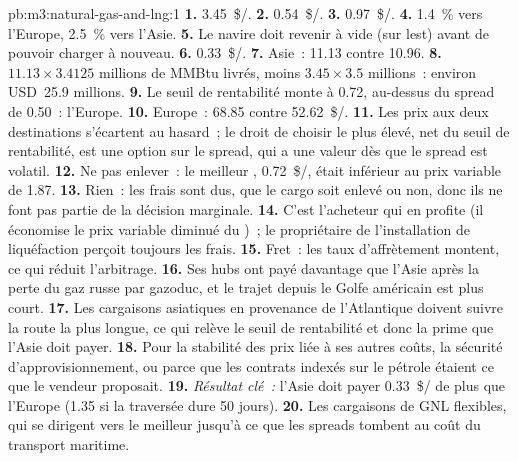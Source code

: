 \begin{solution}{pb:m3:natural-gas-and-lng:1}
\textbf{1.} \qty{3.45}{\$/\mmbtu}. \textbf{2.} \qty{0.54}{\$/\mmbtu}. \textbf{3.}
\qty{0.97}{\$/\mmbtu}. \textbf{4.} 1.4~\% vers l'Europe, 2.5~\% vers l'Asie. \textbf{5.} Le navire
doit revenir à vide (sur lest) avant de pouvoir charger à nouveau.
\textbf{6.} \qty{0.33}{\$/\mmbtu}. \textbf{7.} Asie~:  \qty{11.13}{} contre
\qty{10.96}{}. \textbf{8.} $11.13 \times 3.4125$ millions de MMBtu livrés, moins $3.45 \times
3.5$ millions~: environ USD~25.9 millions. \textbf{9.} Le seuil de rentabilité monte à \qty{0.72}{}, au-dessus
du spread de \qty{0.50}{}~: l'Europe. \textbf{10.} Europe~:  \qty{68.85}{} contre
\qty{52.62}{\$/\mmbtu}.
\textbf{11.} Les prix aux deux destinations s'écartent au hasard~; le droit de choisir le
plus élevé, net du seuil de rentabilité, est une option sur le spread, qui a une valeur dès que le
spread est volatil. \textbf{12.} Ne pas enlever~: le meilleur , \qty{0.72}{\$/\mmbtu}, était
inférieur au prix variable de \qty{1.87}{}. \textbf{13.} Rien~: les frais sont dus,
que le cargo soit enlevé ou non, donc ils ne font pas partie de la décision marginale. \textbf{14.} C'est
l'acheteur qui en profite (il économise le prix variable diminué du )~; le propriétaire de l'installation
de liquéfaction perçoit toujours les frais. \textbf{15.} Fret~: les taux d'affrètement montent, ce qui réduit l'arbitrage.
\textbf{16.} Ses hubs ont payé davantage que l'Asie après la perte du gaz russe par gazoduc, et le
trajet depuis le Golfe américain est plus court. \textbf{17.} Les cargaisons asiatiques en provenance de l'Atlantique doivent suivre
la route la plus longue, ce qui relève le seuil de rentabilité et donc la prime que l'Asie doit payer.
\textbf{18.} Pour la stabilité des prix liée à ses autres coûts, la sécurité d'approvisionnement, ou parce que
les contrats indexés sur le pétrole étaient ce que le vendeur proposait. \textbf{19.} \emph{Résultat clé~:} l'Asie
doit payer \qty{0.33}{\$/\mmbtu} de plus que l'Europe (\qty{1.35}{} si la traversée dure 50 jours).
\textbf{20.} Les cargaisons de GNL flexibles, qui se dirigent vers le meilleur  jusqu'à ce que les spreads tombent au
coût du transport maritime.
\end{solution}

